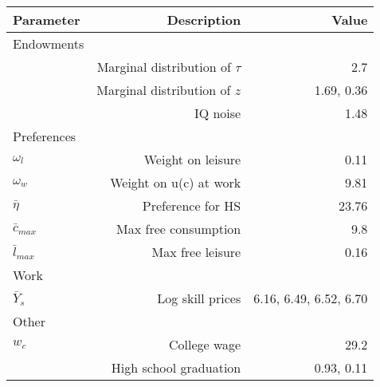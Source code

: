 \begin{tabular}{lrr}
\hline
Parameter & Description  & Value  \\ 
\hline
Endowments &   &   \\ 
 & Marginal distribution of $\tau$  & 2.7  \\ 
 & Marginal distribution of $z$  & 1.69, 0.36  \\ 
 & IQ noise  & 1.48  \\ 
Preferences &   &   \\ 
$\omega_{l}$ & Weight on leisure  & 0.11  \\ 
$\omega_{w}$ & Weight on u(c) at work  & 9.81  \\ 
$\bar{\eta}$ & Preference for HS  & 23.76  \\ 
$\bar{c}_{max}$ & Max free consumption  & 9.8  \\ 
$\bar{l}_{max}$ & Max free leisure  & 0.16  \\ 
Work &   &   \\ 
$\bar{Y}_{s}$ & Log skill prices  & 6.16, 6.49, 6.52, 6.70  \\ 
Other &   &   \\ 
$w_{c}$ & College wage  & 29.2  \\ 
 & High school graduation  & 0.93, 0.11  \\ 
\hline
\end{tabular}%
